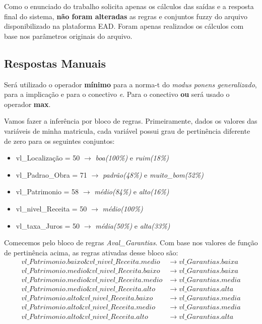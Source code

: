 \documentclass[12pt]{article}
\begin{document}
Como o enunciado do trabalho solicita apenas os cálculos das saídas e a resposta final do sistema, \textbf{não foram alteradas} as regras e conjuntos fuzzy do arquivo disponibilizado na plataforma EAD. Foram apenas realizados os cálculos com base nos parâmetros originais do arquivo.

\subsection{Respostas Manuais}

Será utilizado o operador \textbf{mínimo} para a norma-t do \textit{modus ponens generalizado}, para a implicação e para o conectivo \textit{e}. Para o conectivo \textbf{ou} será usado o operador \textbf{max}.

Vamos fazer a inferência por bloco de regras. Primeiramente, dados os valores das variáveis de minha matricula, cada variável possui grau de pertinência diferente de zero para os seguintes conjuntos:

\begin{itemize}
	\item vl\_Localização = 50 $\to$ \textit{boa(100\%)} e \textit{ruim(18\%)}
	\item vl\_Padrao\_Obra = 71 $\to$ \textit{padrão(48\%)} e \textit{muito\_bom(52\%)}
	\item vl\_Patrimonio = 58 $\to$ \textit{médio(84\%)} e \textit{alto(16\%)}
	\item vl\_nivel\_Receita = 50 $\to$ \textit{médio(100\%)}
	\item vl\_taxa\_Juros = 50	$\to$ \textit{média(50\%)} e \textit{alta(33\%)}
\end{itemize}

Comecemos pelo bloco de regras \textit{Aval\_Garantias}. Com base nos valores de função de pertinência acima, as regras ativadas desse bloco são:
\begin{align*}
	vl\_Patrimonio.baixo\&vl\_nivel\_Receita.medio&\to vl\_Garantias.baixa\\
	vl\_Patrimonio.medio\&vl\_nivel\_Receita.baixo&\to vl\_Garantias.baixa\\
	vl\_Patrimonio.medio\&vl\_nivel\_Receita.medio&\to vl\_Garantias.media\\
	vl\_Patrimonio.medio\&vl\_nivel\_Receita.alto&\to vl\_Garantias.alta\\
	vl\_Patrimonio.alto\&vl\_nivel\_Receita.baixo&\to vl\_Garantias.media\\
	vl\_Patrimonio.alto\&vl\_nivel\_Receita.medio&\to vl\_Garantias.media\\
	vl\_Patrimonio.alto\&vl\_nivel\_Receita.alto&\to vl\_Garantias.alta
\end{align*}
\end{document}
